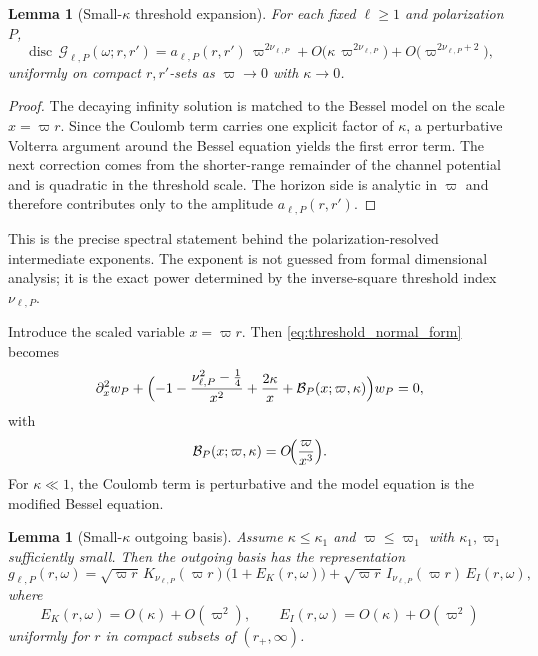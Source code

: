 \documentclass[12pt]{article}
\numberwithin{equation}{section}
\theoremstyle{plain}
\newtheorem{lemma}[theorem]{Lemma}
\theoremstyle{definition}
\theoremstyle{remark}
\newcommand{\disc}{\operatorname{disc}}
\newcommand{\cG}{\mathcal G}
\newcommand{\cB}{\mathcal B}
\newcommand{\om}{\omega}
\newcommand{\vp}{\varpi}
\newcommand{\kap}{\kappa}
\begin{document}
\begin{lemma}[Small-$\kap$ threshold expansion]\label{lem:small_kappa_detailed}
For each fixed $\ell\ge1$ and polarization $P$,
\[
   \disc\,\cG_{\ell,P}(\om;r,r')
   =
   a_{\ell,P}(r,r')\,\vp^{2\nu_{\ell,P}}
   +O\!\bigl(\kap\,\vp^{2\nu_{\ell,P}}\bigr)
   +O\!\bigl(\vp^{2\nu_{\ell,P}+2}\bigr),
\]
uniformly on compact $r,r'$-sets as $\vp\to0$ with $\kap\to0$.
\end{lemma}

\begin{proof}
The decaying infinity solution is matched to the Bessel model on the scale $x=\vp r$.  Since the Coulomb term carries one explicit factor of $\kap$, a perturbative Volterra argument around the Bessel equation yields the first error term.  The next correction comes from the shorter-range remainder of the channel potential and is quadratic in the threshold scale.  The horizon side is analytic in $\vp$ and therefore contributes only to the amplitude $a_{\ell,P}(r,r')$.
\end{proof}

This is the precise spectral statement behind the polarization-resolved intermediate exponents.  The exponent is not guessed from formal dimensional analysis; it is the exact power determined by the inverse-square threshold index $\nu_{\ell,P}$.


Introduce the scaled variable $x=\vp r$.  Then \eqref{eq:threshold_normal_form} becomes
\begin{equation}\label{eq:scaled_small_kappa}
   \partial_x^2w_P+
   \Bigl(
      -1
      -\frac{\nu_{\ell,P}^2-\tfrac14}{x^2}
      +\frac{2\kap}{x}
      +\cB_P(x;\vp,\kap)
   \Bigr)w_P=0,
\end{equation}
with
\[
   \cB_P(x;\vp,\kap)=O\!\Bigl(\frac{\vp}{x^3}\Bigr).
\]
For $\kap\ll1$, the Coulomb term is perturbative and the model equation is the modified Bessel equation.

\begin{lemma}[Small-$\kap$ outgoing basis]\label{lem:small_kappa_basis}
Assume $\kap\le\kap_1$ and $\vp\le\vp_1$ with $\kap_1,\vp_1$ sufficiently small.  Then the outgoing basis has the representation
\begin{equation}\label{eq:small_kappa_basis_rep}
   g_{\ell,P}(r,\om)
   =
   \sqrt{\vp r}\,K_{\nu_{\ell,P}}(\vp r)\bigl(1+E_K(r,\om)\bigr)
   +
   \sqrt{\vp r}\,I_{\nu_{\ell,P}}(\vp r)\,E_I(r,\om),
\end{equation}
where
\[
   E_K(r,\om)=O(\kap)+O(\vp^2),
   \qquad
   E_I(r,\om)=O(\kap)+O(\vp^2)
\]
uniformly for $r$ in compact subsets of $(r_+,\infty)$.
\end{lemma}
\end{document}
